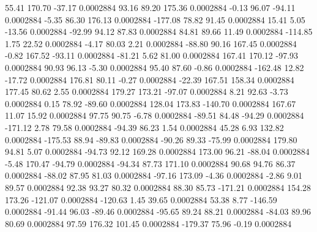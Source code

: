        55.41      170.70      -37.17     0.0002884
       93.16       89.20      175.36     0.0002884
       -0.13       96.07      -94.11     0.0002884
       -5.35       86.30      176.13     0.0002884
     -177.08       78.82       91.45     0.0002884
       15.41        5.05      -13.56     0.0002884
      -92.99       94.12       87.83     0.0002884
       84.81       89.66       11.49     0.0002884
     -114.85        1.75       22.52     0.0002884
       -4.17       80.03        2.21     0.0002884
      -88.80       90.16      167.45     0.0002884
       -0.82      167.52      -93.11     0.0002884
      -81.21        5.62       81.00     0.0002884
      167.41      170.12      -97.93     0.0002884
       90.93       96.13       -5.30     0.0002884
       95.40       87.60       -0.86     0.0002884
     -162.48       12.82      -17.72     0.0002884
      176.81       80.11       -0.27     0.0002884
      -22.39      167.51      158.34     0.0002884
      177.45       80.62        2.55     0.0002884
      179.27      173.21      -97.07     0.0002884
        8.21       92.63       -3.73     0.0002884
        0.15       78.92      -89.60     0.0002884
      128.04      173.83     -140.70     0.0002884
      167.67       11.07       15.92     0.0002884
       97.75       90.75       -6.78     0.0002884
      -89.51       84.48      -94.29     0.0002884
     -171.12        2.78       79.58     0.0002884
      -94.39       86.23        1.54     0.0002884
       45.28        6.93      132.82     0.0002884
     -175.53       88.94      -89.83     0.0002884
      -90.26       89.33      -75.99     0.0002884
      179.80       94.81        5.07     0.0002884
      -94.73       92.12      169.28     0.0002884
      173.00       96.21      -88.04     0.0002884
       -5.48      170.47      -94.79     0.0002884
      -94.34       87.73      171.10     0.0002884
       90.68       94.76       86.37     0.0002884
      -88.02       87.95       81.03     0.0002884
      -97.16      173.09       -4.36     0.0002884
       -2.86        9.01       89.57     0.0002884
       92.38       93.27       80.32     0.0002884
       88.30       85.73     -171.21     0.0002884
      154.28      173.26     -121.07     0.0002884
     -120.63        1.45       39.65     0.0002884
       53.38        8.77     -146.59     0.0002884
      -91.44       96.03      -89.46     0.0002884
      -95.65       89.24       88.21     0.0002884
      -84.03       89.96       80.69     0.0002884
       97.59      176.32      101.45     0.0002884
     -179.37       75.96       -0.19     0.0002884
